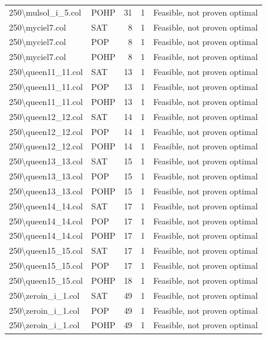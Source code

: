 \begin{longtable}{llrrl}
250\textbackslash{}mulsol\_i\_5.col & POHP & 31 & 1 & Feasible, not proven optimal \\
250\textbackslash{}myciel7.col & SAT & 8 & 1 & Feasible, not proven optimal \\
250\textbackslash{}myciel7.col & POP & 8 & 1 & Feasible, not proven optimal \\
250\textbackslash{}myciel7.col & POHP & 8 & 1 & Feasible, not proven optimal \\
250\textbackslash{}queen11\_11.col & SAT & 13 & 1 & Feasible, not proven optimal \\
250\textbackslash{}queen11\_11.col & POP & 13 & 1 & Feasible, not proven optimal \\
250\textbackslash{}queen11\_11.col & POHP & 13 & 1 & Feasible, not proven optimal \\
250\textbackslash{}queen12\_12.col & SAT & 14 & 1 & Feasible, not proven optimal \\
250\textbackslash{}queen12\_12.col & POP & 14 & 1 & Feasible, not proven optimal \\
250\textbackslash{}queen12\_12.col & POHP & 14 & 1 & Feasible, not proven optimal \\
250\textbackslash{}queen13\_13.col & SAT & 15 & 1 & Feasible, not proven optimal \\
250\textbackslash{}queen13\_13.col & POP & 15 & 1 & Feasible, not proven optimal \\
250\textbackslash{}queen13\_13.col & POHP & 15 & 1 & Feasible, not proven optimal \\
250\textbackslash{}queen14\_14.col & SAT & 17 & 1 & Feasible, not proven optimal \\
250\textbackslash{}queen14\_14.col & POP & 17 & 1 & Feasible, not proven optimal \\
250\textbackslash{}queen14\_14.col & POHP & 17 & 1 & Feasible, not proven optimal \\
250\textbackslash{}queen15\_15.col & SAT & 17 & 1 & Feasible, not proven optimal \\
250\textbackslash{}queen15\_15.col & POP & 17 & 1 & Feasible, not proven optimal \\
250\textbackslash{}queen15\_15.col & POHP & 18 & 1 & Feasible, not proven optimal \\
250\textbackslash{}zeroin\_i\_1.col & SAT & 49 & 1 & Feasible, not proven optimal \\
250\textbackslash{}zeroin\_i\_1.col & POP & 49 & 1 & Feasible, not proven optimal \\
250\textbackslash{}zeroin\_i\_1.col & POHP & 49 & 1 & Feasible, not proven optimal \\

\end{longtable}
